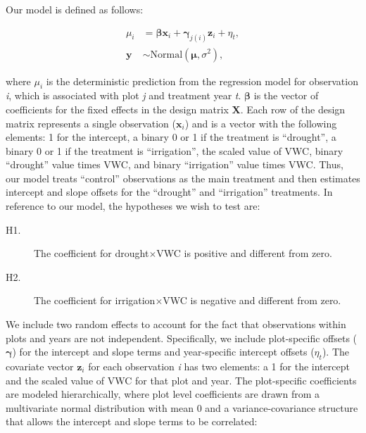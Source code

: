\documentclass[fleqn,10pt,lineno]{wlpeerj} %
\begin{document}
Our model is defined as follows:

\vspace{-2em}

\begin{align}
\mu_{i} &= \boldsymbol{\beta}\textbf{x}_i + \boldsymbol{\gamma}_{j(i)}\textbf{z}_i + \eta_t, \\
\textbf{y} &\sim \text{Normal} \left(\boldsymbol{\mu}, \sigma^2 \right),
\end{align}

\noindent{}where \(\mu_{i}\) is the deterministic prediction from the
regression model for observation \emph{i}, which is associated with plot
\emph{j} and treatment year \emph{t}. \(\boldsymbol{\beta}\) is the
vector of coefficients for the fixed effects in the design matrix
\(\textbf{X}\). Each row of the design matrix represents a single
observation (\(\textbf{x}_i\)) and is a vector with the following
elements: 1 for the intercept, a binary 0 or 1 if the treatment is
``drought'', a binary 0 or 1 if the treatment is ``irrigation'', the
scaled value of VWC, binary ``drought'' value times VWC, and binary
``irrigation'' value times VWC. Thus, our model treats ``control''
observations as the main treatment and then estimates intercept and
slope offsets for the ``drought'' and ``irrigation'' treatments. In
reference to our model, the hypotheses we wish to test are:

\begin{description}
\item [H1.] The coefficient for drought$\times$VWC is positive and different from zero.
\item [H2.] The coefficient for irrigation$\times$VWC is negative and different from zero.
\end{description}

We include two random effects to account for the fact that observations
within plots and years are not independent. Specifically, we include
plot-specific offsets (\(\boldsymbol{\gamma}\)) for the intercept and
slope terms and year-specific intercept offsets (\(\eta_t\)). The
covariate vector \(\textbf{z}_i\) for each observation \emph{i} has two
elements: a 1 for the intercept and the scaled value of VWC for that
plot and year. The plot-specific coefficients are modeled
hierarchically, where plot level coefficients are drawn from a
multivariate normal distribution with mean 0 and a variance-covariance
structure that allows the intercept and slope terms to be correlated:

\vspace{-1em}
\end{document}
